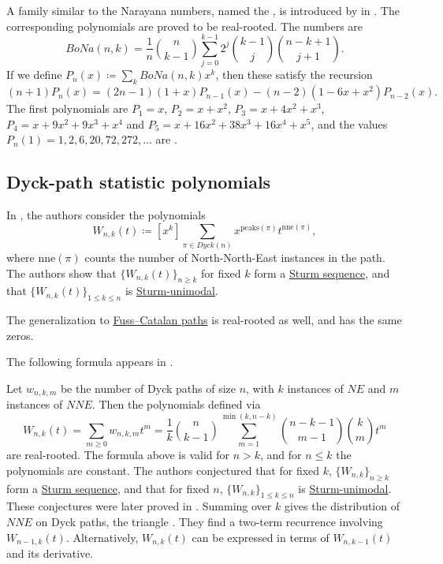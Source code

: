 \begin{example*}

A family similar to the Narayana numbers, named the
\label{booleanNarayanaNumberDefinition}, is
introduced by  in \cite{Bona2026x}.
The corresponding polynomials are proved to be real-rooted.  The
numbers are
\[
 BoNa(n,k) =
 \frac{1}{n}\binom{n}{k-1}
 \sum_{j=0}^{k-1}2^j\binom{k-1}{j}\binom{n-k+1}{j+1}.
\]
If we define $P_n(x) \coloneqq \sum_{k} BoNa(n,k)x^k$, then these satisfy the
recursion
\[
 (n+1) P_n(x) = (2n-1)(1+x) P_{n-1}(x) - (n-2)(1-6x+x^2) P_{n-2}(x).
\]
The first polynomials are $P_1=x$, $P_2=x+x^2$, $P_3=x+4x^2+x^3$,
$P_4=x+9x^2+9x^3+x^4$ and $P_5=x+16x^2+38x^3+16x^4+x^5$, and the values
$P_n(1)=1,2,6,20,72,272,\dotsc$ are .
\end{example*}


\subsection[dyckPathStatisticPolynomialsRealRooted]{Dyck-path statistic polynomials}

\begin{example*}

In \cite{WangZhang2024}, the authors consider the polynomials
\[
 W_{n,k}(t) \coloneqq
 [x^k] \sum_{\pi \in Dyck(n)}
 x^{\mathrm{peaks}(\pi)} t^{\mathrm{nne}(\pi)},
\]
where $\mathrm{nne}(\pi)$ counts the number of North-North-East instances in
the path.
The authors show that $\{ W_{n,k}(t) \}_{n \geq k}$ for fixed $k$ form a
\hyperref[sturmSequence]{Sturm sequence}, and that
$\{ W_{n,k}(t) \}_{1\leq k \leq n}$ is \hyperref[sturmSequence]{Sturm-unimodal}.

The generalization to \hyperref[fussCatalanNNERealRooted]{Fuss--Catalan paths}
is real-rooted as well, and has the same zeros.


The following formula appears in
\cite{BonaDimitrovLabelleLiPappeVindasMelendezZhuang2025}.

Let $w_{n,k,m}$ be the number of Dyck paths of size $n$, with $k$
instances of $NE$ and $m$ instances of $NNE$.  Then the polynomials defined via
\[
W_{n,k}(t) =
\sum_{m\geq 0} w_{n,k,m}t^m =
\frac{1}{k} \binom{n}{k-1}
\sum_{m=1}^{\min(k,n-k)}
  \binom{n-k-1}{m-1}\binom{k}{m} t^m
\]
are real-rooted.  The formula above is valid for $n \gt k$, and for
$n \leq k$ the polynomials are constant.
The authors conjectured that for fixed $k$, $\{W_{n,k}\}_{n\geq k}$ form a
\hyperref[sturmSequence]{Sturm sequence}, and that for fixed $n$,
$\{W_{n,k}\}_{1 \leq k\leq n}$ is
\hyperref[sturmSequence]{Sturm-unimodal}.
These conjectures were later proved in \cite{WangZhang2024}.
Summing over $k$ gives the distribution of $NNE$ on Dyck paths,
the triangle .
They find a two-term recurrence involving \(W_{n-1,k}(t)\).  Alternatively,
\(W_{n,k}(t)\) can be expressed in terms of \(W_{n,k-1}(t)\) and its
derivative.
\end{example*}


